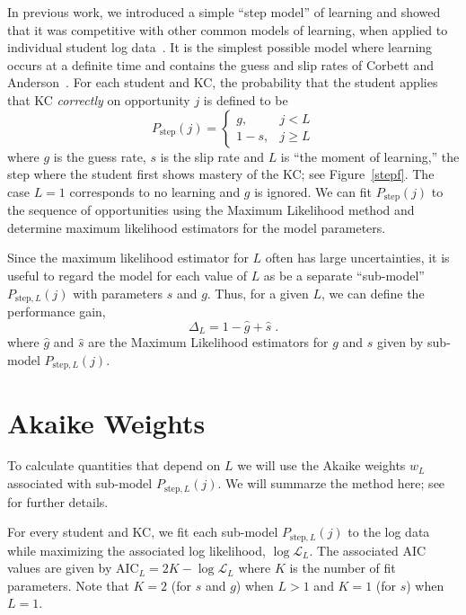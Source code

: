 \documentclass{edm_template}
\begin{document}
In previous work, we introduced a simple ``step model'' of learning
and showed that it was competitive with other common models
of learning, when applied to individual student log
data~\cite{van_de_sande_applying_2013}.
It is the simplest possible model where learning occurs at
a definite time and contains the guess and slip rates of Corbett and 
Anderson~\cite{corbett_knowledge_1995}.  For each student and KC,
the probability that the student applies that KC {\em correctly} on 
opportunity $j$ is defined to be
%
\begin{equation}
               P_\mathrm{step}(j) = \left\{\begin{array}{cc}
                                       g,& j<L\\
				       1-s,& j\ge L
                                    \end{array}\right. \label{step}
\end{equation}
%
where $g$ is the guess rate, $s$ is the slip rate and 
$L$ is ``the moment of learning,'' the step where the student
first shows mastery of the KC; see Figure~\ref{stepf}.  The case $L=1$
corresponds to no learning and $g$ is ignored.
%
We can fit $P_\mathrm{step}(j)$ to the sequence of opportunities using the
Maximum Likelihood method and determine maximum likelihood estimators
for the model parameters.  

Since the maximum likelihood estimator for $L$ often has large
uncertainties, it is useful to regard the model for each value of $L$
as be a separate ``sub-model''  $P_{\mathrm{step},L}(j)$ with parameters
$s$ and $g$.
Thus, for a given $L$, we can define the performance gain,
%
\begin{equation}
         \Delta_L = 1- \hat{g}+\hat{s}\; . \label{gain}
\end{equation}
%
where $\hat{g}$ and $\hat{s}$ are the
Maximum Likelihood estimators for $g$ and $s$ given by sub-model
$P_{\mathrm{step},L}(j)$. 

\section{Akaike Weights}

To calculate quantities that depend on $L$ we will use the
Akaike weights $w_L$  \cite{burnham_model_2002} associated with sub-model
$P_{\mathrm{step},L}(j)$.  We will summarze the
method here; see~\cite{van_de_sande_measuring_2013}  for further
details.

For every student and KC, we fit each sub-model $P_{\mathrm{step},L}(j)$ to the
 log data while maximizing the associated log likelihood, $\log\mathcal{L}_L$.  The associated
AIC values are given by $\mathrm{AIC}_L=2 K-\log \mathcal{L}_L$ where
$K$ is the number of fit parameters.  Note that $K=2$  (for $s$ and
$g$) when $L>1$ and $K=1$ (for $s$) when $L=1$.
\end{document}
